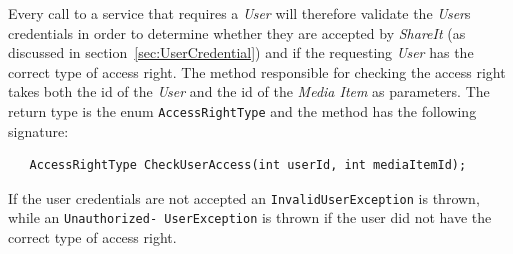 \documentclass[../report.tex]{subfiles}
\begin{document}
Every call to a service that requires a \textit{User} will therefore validate the \textit{User}s credentials in order to determine whether they are accepted by \textit{ShareIt} (as discussed in section~\ref{sec:UserCredential}) and if the requesting \textit{User} has the correct type of access right. The method responsible for checking the access right takes both the id of the \textit{User} and the id of the \textit{Media Item} as parameters. The return type is the enum \texttt{AccessRightType} and the method has the following signature:

\begin{lstlisting}
   AccessRightType CheckUserAccess(int userId, int mediaItemId);
\end{lstlisting}


If the user credentials are not accepted an \texttt{InvalidUserException} is thrown, while an \texttt{Unauthorized- UserException} is thrown if the user did not have the correct type of access right. 
\end{document}
